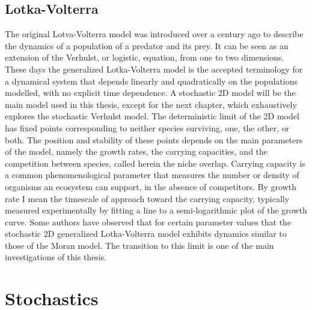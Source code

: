 \subsection{Lotka-Volterra}
The original Lotva-Volterra model was introduced over a century ago to describe the dynamics of a population of a predator and its prey. 
It can be seen as an extension of the Verhulst, or logistic, equation, from one to two dimensions. 
These days the generalized Lotka-Volterra model is the accepted terminology for a dynamical system that depends linearly and quadratically on the populations modelled, with no explicit time dependence. 
A stochastic 2D model will be the main model used in this thesis, except for the next chapter, which exhaustively explores the stochastic Verhulst model. 
The deterministic limit of the 2D model has fixed points corresponding to neither species surviving, one, the other, or both. 
The position and stability of these points depends on the main parameters of the model, namely the growth rates, the carrying capacities, and the competition between species, called herein the niche overlap. 
Carrying capacity is a common phenomenological parameter that measures the number or density of organisms an ecosystem can support, in the absence of competitors. 
By growth rate I mean the timescale of approach toward the carrying capacity, typically measured experimentally by fitting a line to a semi-logarithmic plot of the growth curve. 
Some authors \cite{Lin2012,Constable2015,Chotibut2015} have observed that for certain parameter values that the stochastic 2D generalized Lotka-Volterra model exhibits dynamics similar to those of the Moran model. The transition to this limit is one of the main investigations of this thesis. 



\section{Stochastics}
